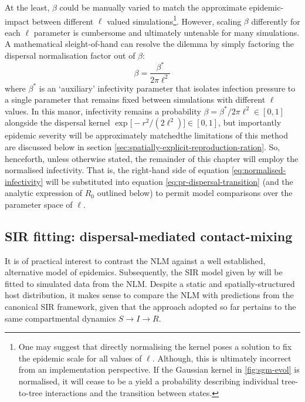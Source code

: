 At the least, $\beta$ could be manually varied to match the approximate epidemic-impact between different $\ell$ valued simulations\footnote{One may suggest that directly normalising the kernel poses a solution to fix the epidemic scale for all values of $\ell$.
Although, this is ultimately incorrect from an implementation perspective. 
If the Gaussian kernel in \ref{fig:sgm-evol} is normalised, it will cease to be a yield a probability describing individual tree-to-tree interactions and the transition between states.}. 
However, scaling $\beta$ differently for each $\ell$ parameter is cumbersome and ultimately untenable for many simulations.
A mathematical sleight-of-hand can resolve the dilemma by simply factoring the dispersal normalisation factor out of $\beta$:
\begin{equation}
    \beta = \frac{\beta^*}{2\pi\ell^2}
    \label{eq:normalised-infectivity}
\end{equation}
where $\beta^*$ is an `auxiliary' infectivity parameter that isolates infection pressure to a single parameter that remains fixed between simulations with different $\ell$ values.
In this manor, infectivity remains a probability $\beta=\beta^*/2\pi\ell^2 \in [0, 1]$ alongside the dispersal kernel $\exp\big[-r^2/(2\ell^2)\big] \in [0, 1]$, but importantly epidemic severity will be approximately matched\textemdash the limitations of this method are discussed below in section \ref{sec:spatially-explicit-reproduction-ration}.
So, henceforth, unless otherwise stated, the remainder of this chapter will employ the normalised infectivity.
That is, the right-hand side of equation \ref{eq:normalised-infectivity} will be substituted into equation \ref{eq:pr-dispersal-transition} (and the analytic expression of $R_0$ outlined below) to permit model comparisons over the parameter space of $\ell$.

\subsection{SIR fitting: dispersal-mediated contact-mixing}
\label{sec:SIR-fitting}

It is of practical interest to contrast the NLM against a well established, alternative model of epidemics.
Subsequently, the SIR model given by \cite{kermack-model} will be fitted to simulated data from the NLM.
Despite a static and spatially-structured host distribution, it makes sense to compare the NLM with predictions from the canonical SIR framework, given that the approach adopted so far pertains to the same compartmental dynamics $S \rightarrow I \rightarrow R$.

